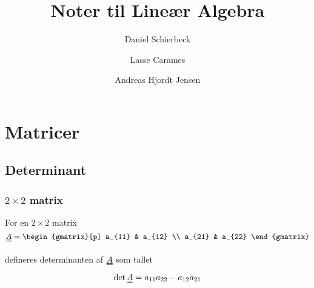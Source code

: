 \documentclass[a4paper]{article}
\title{Noter til Lineær Algebra}
\author{Daniel Schierbeck \and Lasse Carames \and Andreas Hjordt Jensen}
\newcommand{\mtx}[1]{\uuline{#1}}
\begin{document}
\maketitle

\section{Matricer}

\subsection{Determinant}

\subsubsection{$2 \times 2$ matrix}

For en $2 \times 2$ matrix
$$
\mtx{A} =
\begin{gmatrix}[p]
    a_{11} & a_{12} \\
    a_{21} & a_{22}
\end{gmatrix}
$$

defineres determinanten af $\mtx{A}$ som tallet
$$
\det{\mtx{A}} = a_{11}a_{22} - a_{12}a_{21}
$$
\end{document}
